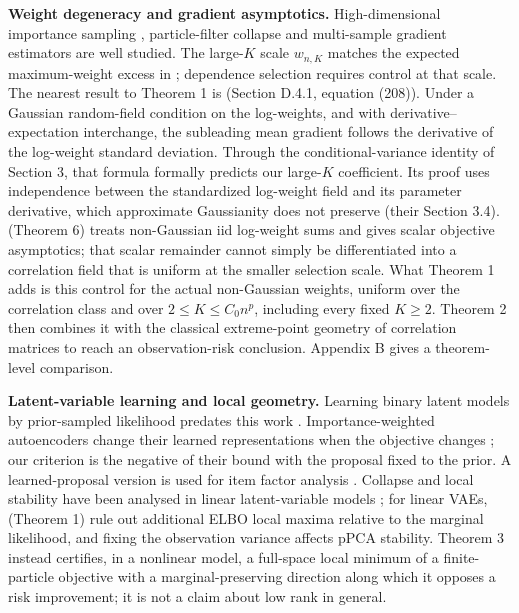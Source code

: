\documentclass{article}
\begin{document}
\textbf{Weight degeneracy and gradient asymptotics.} High-dimensional
importance sampling \citep{agapiou2017, chatterjee2018}, particle-filter
collapse \citep{bengtsson2008, bickel2008, snyder2008} and multi-sample
gradient estimators \citep{rainforth2018, tucker2019} are well studied.
The large-\(K\) scale \(w_{n,K}\) matches the expected maximum-weight
excess in \citet{bickel2008}; dependence selection requires control at
that scale. The nearest result to Theorem 1 is \citet{daudel2026}
(Section D.4.1, equation (208)). Under a Gaussian random-field condition
on the log-weights, and with derivative--expectation interchange, the
subleading mean gradient follows the derivative of the log-weight
standard deviation. Through the conditional-variance identity of Section
3, that formula formally predicts our large-\(K\) coefficient. Its proof
uses independence between the standardized log-weight field and its
parameter derivative, which approximate Gaussianity does not preserve
(their Section 3.4). \citet{daudel2023} (Theorem 6) treats non-Gaussian
iid log-weight sums and gives scalar objective asymptotics; that scalar
remainder cannot simply be differentiated into a correlation field that
is uniform at the smaller selection scale. What Theorem 1 adds is this
control for the actual non-Gaussian weights, uniform over the
correlation class and over \(2\le K\le C_0n^p\), including every fixed
\(K\ge2\). Theorem 2 then combines it with the classical extreme-point
geometry of correlation matrices \citep{litam1994} to reach an
observation-risk conclusion. Appendix B gives a theorem-level
comparison.

\textbf{Latent-variable learning and local geometry.} Learning binary
latent models by prior-sampled likelihood predates this work
\citep{tipping1998}. Importance-weighted autoencoders change their
learned representations when the objective changes \citep[Section 5.2
and Table 2]{burda2016}; our criterion is the negative of their bound
with the proposal fixed to the prior. A learned-proposal version is used
for item factor analysis \citep{urban2021}. Collapse and local stability
have been analysed in linear latent-variable models
\citep{lucas2019, wangziyin2022}; for linear VAEs, \citet{lucas2019}
(Theorem 1) rule out additional ELBO local maxima relative to the
marginal likelihood, and fixing the observation variance affects pPCA
stability. Theorem 3 instead certifies, in a nonlinear model, a
full-space local minimum of a finite-particle objective with a
marginal-preserving direction along which it opposes a risk improvement;
it is not a claim about low rank in general.
\end{document}
